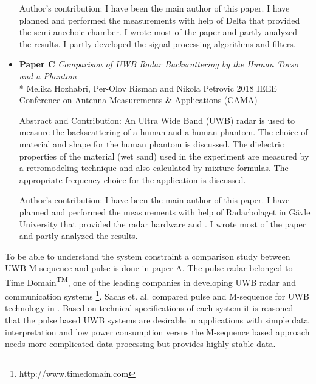 \begin{itemize}
	Author's contribution:
	I have been the main author of this paper. I have planned and performed the measurements with help of Delta that provided the semi-anechoic chamber. I wrote most of the paper and partly analyzed the results. I partly developed the signal processing algorithms and filters.  
	\item\textbf{Paper C} \textit{Comparison of UWB Radar Backscattering by the
    Human Torso and a Phantom}\\*
		Melika Hozhabri, Per-Olov Risman and Nikola Petrovic
		2018 IEEE Conference on Antenna Measurements \& Applications (CAMA)
		
	Abstract and Contribution: An Ultra Wide Band (UWB) radar is used to measure the backscattering of a human and a human phantom. The choice of material and shape for the human phantom is discussed. The dielectric properties of the material (wet sand) used in the experiment are measured by a retromodeling technique and also calculated by mixture formulas. The appropriate frequency choice for the application is discussed.
	
	Author's contribution:
	I have been the main author of this paper. I have planned and performed the measurements with help of Radarbolaget in G{\"a}vle University that provided the radar hardware and . I wrote most of the paper and partly analyzed the results.
	
\end{itemize}
To be able to understand the system constraint a comparison study between UWB M-sequence and pulse is done in paper A. The pulse radar belonged to Time Domain\textsuperscript{TM}, one of the leading companies in developing UWB radar and communication systems \footnote{http://www.timedomain.com}. Sachs et. al. compared pulse and M-sequence for UWB technology in \cite{sachs2003stimulation}. Based on technical specifications of each system it is reasoned that the pulse based UWB systems are desirable in applications with simple data interpretation and low power consumption versus the M-sequence based approach needs more complicated data processing but provides highly stable data.